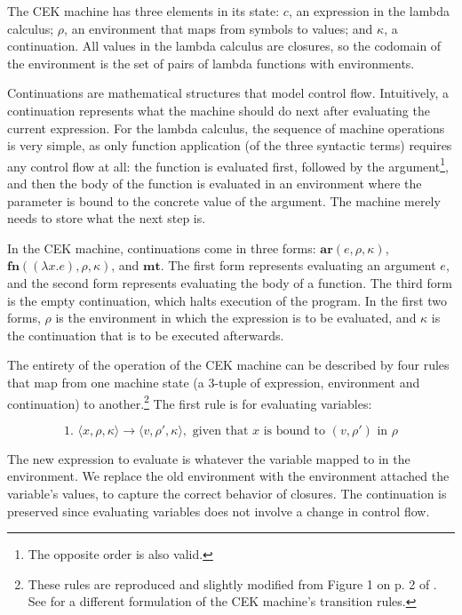 \documentclass{article}
\begin{document}
The CEK machine has three elements in its state: $c$, an expression in the lambda calculus; $\rho$, an environment that maps from symbols to values; and $\kappa$, a continuation. All values in the lambda calculus are closures, so the codomain of the environment is the set of pairs of lambda functions with environments.

Continuations are mathematical structures that model control flow. Intuitively, a continuation represents what the machine should do next after evaluating the current expression. For the lambda calculus, the sequence of machine operations is very simple, as only function application (of the three syntactic terms) requires any control flow at all: the function is evaluated first, followed by the argument\footnote{The opposite order is also valid.}, and then the body of the function is evaluated in an environment where the parameter is bound to the concrete value of the argument. The machine merely needs to store what the next step is.

In the CEK machine, continuations come in three forms: $\textbf{ar}(e, \rho, \kappa)$, $\textbf{fn}((\lambda x.e), \rho, \kappa)$, and $\textbf{mt}$. The first form represents evaluating an argument $e$, and the second form represents evaluating the body of a function. The third form is the empty continuation, which halts execution of the program. In the first two forms, $\rho$ is the environment in which the expression is to be evaluated, and $\kappa$ is the continuation that is to be executed afterwards.

The entirety of the operation of the CEK machine can be described by four rules that map from one machine state (a 3-tuple of expression, environment and continuation) to another.\footnote{These rules are reproduced and slightly modified from Figure 1 on p. 2 of \cite{aam}. See \cite{cek} for a different formulation of the CEK machine's transition rules.} The first rule is for evaluating variables:

$$ \text{1. } \langle x, \rho, \kappa \rangle \to \langle v, \rho', \kappa \rangle, \text{ given that $x$ is bound to $(v, \rho')$ in $\rho$} $$

The new expression to evaluate is whatever the variable mapped to in the environment. We replace the old environment with the environment attached the variable's values, to capture the correct behavior of closures. The continuation is preserved since evaluating variables does not involve a change in control flow.
\end{document}
